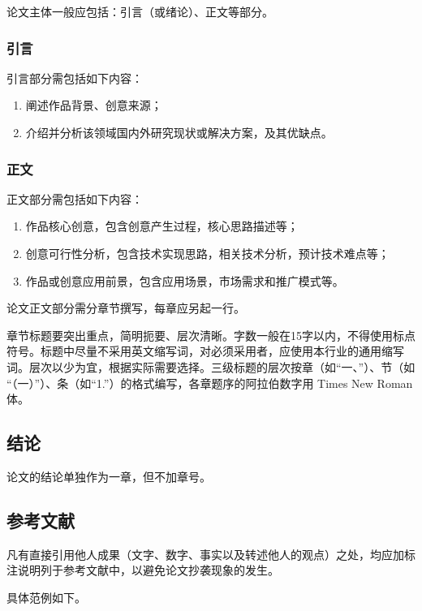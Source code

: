 \documentclass{buaa_fengru}
\begin{document}
论文主体一般应包括：引言（或绪论）、正文等部分。

\subsubsection{引言}

引言部分需包括如下内容：

\begin{enumerate}[nosep]
    \item 阐述作品背景、创意来源；
    \item 介绍并分析该领域国内外研究现状或解决方案，及其优缺点。
\end{enumerate}

\subsubsection{正文}

正文部分需包括如下内容：

\begin{enumerate}[nosep]
    \item 作品核心创意，包含创意产生过程，核心思路描述等；
    \item 创意可行性分析，包含技术实现思路，相关技术分析，预计技术难点等；
    \item 作品或创意应用前景，包含应用场景，市场需求和推广模式等。
\end{enumerate}

论文正文部分需分章节撰写，每章应另起一行。

章节标题要突出重点，简明扼要、层次清晰。字数一般在15字以内，不得使用标点符号。标题中尽量不采用英文缩写词，对必须采用者，应使用本行业的通用缩写词。层次以少为宜，根据实际需要选择。三级标题的层次按章（如“一、”）、节（如 “（一）”）、条（如“1.”）的格式编写，各章题序的阿拉伯数字用 Times New Roman 体。

\subsection{结论}

论文的结论单独作为一章，但不加章号。


\subsection{参考文献}

凡有直接引用他人成果（文字、数字、事实以及转述他人的观点）之处，均应加标注说明列于参考文献中，以避免论文抄袭现象的发生。

具体范例如下。
\end{document}
